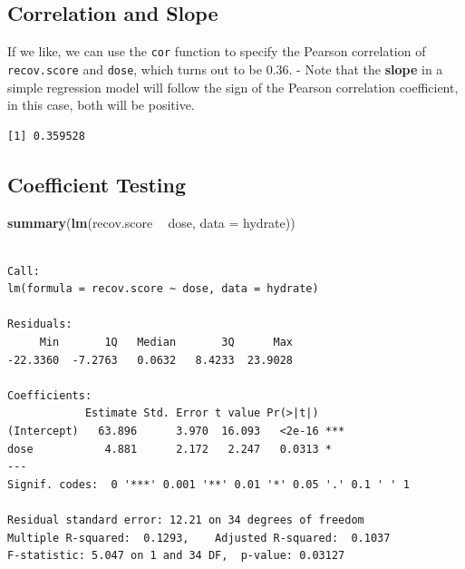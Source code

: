 \documentclass[
]{book}
\newenvironment{Shaded}{\begin{snugshade}}{\end{snugshade}}
\newcommand{\DataTypeTok}[1]{\textcolor[rgb]{0.13,0.29,0.53}{#1}}
\newcommand{\KeywordTok}[1]{\textcolor[rgb]{0.13,0.29,0.53}{\textbf{#1}}}
\newcommand{\NormalTok}[1]{#1}
\newcommand{\OperatorTok}[1]{\textcolor[rgb]{0.81,0.36,0.00}{\textbf{#1}}}
\newcommand{\StringTok}[1]{\textcolor[rgb]{0.31,0.60,0.02}{#1}}
\begin{document}
\hypertarget{correlation-and-slope}{%
\subsection{Correlation and Slope}\label{correlation-and-slope}}

If we like, we can use the \texttt{cor} function to specify the Pearson correlation of \texttt{recov.score} and \texttt{dose}, which turns out to be 0.36.
- Note that the \textbf{slope} in a simple regression model will follow the sign of the Pearson correlation coefficient, in this case, both will be positive.

\begin{Shaded}
\end{Shaded}

\begin{verbatim}
[1] 0.359528
\end{verbatim}

\hypertarget{coefficient-testing}{%
\subsection{Coefficient Testing}\label{coefficient-testing}}

\begin{Shaded}
\begin{Highlighting}[]
\KeywordTok{summary}\NormalTok{(}\KeywordTok{lm}\NormalTok{(recov.score }\OperatorTok{~}\StringTok{ }\NormalTok{dose, }\DataTypeTok{data =}\NormalTok{ hydrate))}
\end{Highlighting}
\end{Shaded}

\begin{verbatim}

Call:
lm(formula = recov.score ~ dose, data = hydrate)

Residuals:
     Min       1Q   Median       3Q      Max 
-22.3360  -7.2763   0.0632   8.4233  23.9028 

Coefficients:
            Estimate Std. Error t value Pr(>|t|)    
(Intercept)   63.896      3.970  16.093   <2e-16 ***
dose           4.881      2.172   2.247   0.0313 *  
---
Signif. codes:  0 '***' 0.001 '**' 0.01 '*' 0.05 '.' 0.1 ' ' 1

Residual standard error: 12.21 on 34 degrees of freedom
Multiple R-squared:  0.1293,	Adjusted R-squared:  0.1037 
F-statistic: 5.047 on 1 and 34 DF,  p-value: 0.03127
\end{verbatim}
\end{document}

